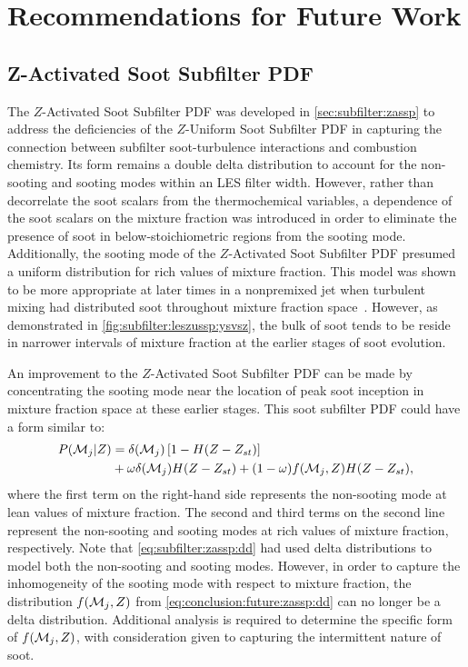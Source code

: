 \section{Recommendations for Future Work}
\label{sec:conclusion:future}

\subsection{Z-Activated Soot Subfilter PDF}
\label{sec:conclusion:future:zassp}

The $Z$-Activated Soot Subfilter PDF was developed in \cref{sec:subfilter:zassp} to address the deficiencies of the $Z$-Uniform Soot Subfilter PDF in capturing the connection between subfilter soot-turbulence interactions and combustion chemistry. Its form remains a double delta distribution to account for the non-sooting and sooting modes within an LES filter width. However, rather than decorrelate the soot scalars from the thermochemical variables, a dependence of the soot scalars on the mixture fraction was introduced in order to eliminate the presence of soot in below-stoichiometric regions from the sooting mode. Additionally, the sooting mode of the $Z$-Activated Soot Subfilter PDF presumed a uniform distribution for rich values of mixture fraction. This model was shown to be more appropriate at later times in a nonpremixed jet when turbulent mixing had distributed soot throughout mixture fraction space~\cite{attili2014}. However, as demonstrated in \cref{fig:subfilter:leszussp:ysvsz}, the bulk of soot tends to be reside in narrower intervals of mixture fraction at the earlier stages of soot evolution.

An improvement to the $Z$-Activated Soot Subfilter PDF can be made by concentrating the sooting mode near the location of peak soot inception in mixture fraction space at these earlier stages. This soot subfilter PDF could have a form similar to:
\begin{equation}\label{eq:conclusion:future:zassp:dd}
  \begin{split}
    P(\mathcal{M}_j|Z) &= \delta(\mathcal{M}_j)\left[ 1 - H(Z - Z_{st}) \right] \\
    &+ \omega\delta(\mathcal{M}_j)H(Z - Z_{st}) + (1 - \omega)f(\mathcal{M}_j, Z)H(Z - Z_{st}),
  \end{split}
\end{equation}
where the first term on the right-hand side represents the non-sooting mode at lean values of mixture fraction. The second and third terms on the second line represent the non-sooting and sooting modes at rich values of mixture fraction, respectively. Note that \cref{eq:subfilter:zassp:dd} had used delta distributions to model both the non-sooting and sooting modes. However, in order to capture the inhomogeneity of the sooting mode with respect to mixture fraction, the distribution $f(\mathcal{M}_j, Z)$ from \cref{eq:conclusion:future:zassp:dd} can no longer be a delta distribution. Additional analysis is required to determine the specific form of $f(\mathcal{M}_j, Z)$, with consideration given to capturing the intermittent nature of soot.

